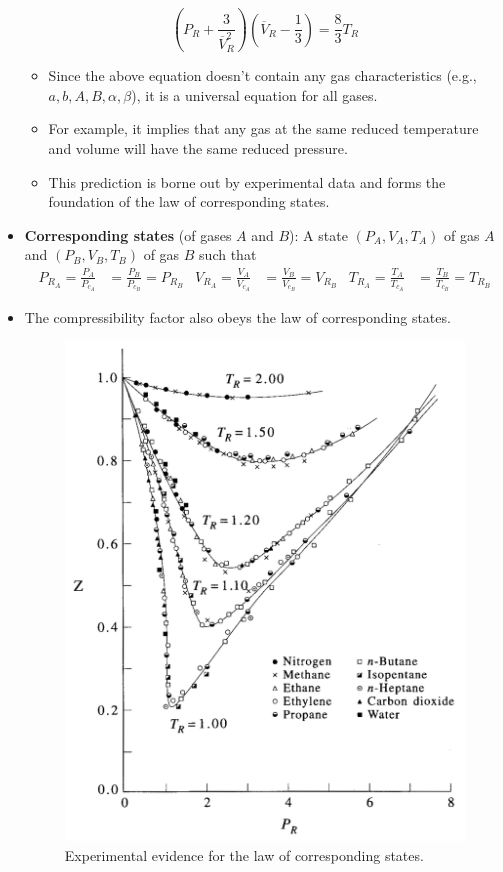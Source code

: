 \documentclass[../notes.tex]{subfiles}
\begin{document}
\begin{itemize}
    \begin{equation*}
        \left( P_R+\frac{3}{\overline{V}_R^2} \right)\left( \overline{V}_R-\frac{1}{3} \right) = \frac{8}{3}T_R
    \end{equation*}
    \begin{itemize}
        \item Since the above equation doesn't contain any gas characteristics (e.g., $a,b,A,B,\alpha,\beta$), it is a universal equation for all gases.
        \item For example, it implies that any gas at the same reduced temperature and volume will have the same reduced pressure.
        \item This prediction is borne out by experimental data and forms the foundation of the law of corresponding states.
    \end{itemize}
    \item \textbf{Corresponding states} (of gases $A$ and $B$): A state $(P_A,V_A,T_A)$ of gas $A$ and $(P_B,V_B,T_B)$ of gas $B$ such that
    \begin{align*}
        P_{R_A} = \frac{P_A}{P_{c_A}} &= \frac{P_B}{P_{c_B}} = P_{R_B}&
        V_{R_A} = \frac{V_A}{V_{c_A}} &= \frac{V_B}{V_{c_B}} = V_{R_B}&
        T_{R_A} = \frac{T_A}{T_{c_A}} &= \frac{T_B}{T_{c_B}} = T_{R_B}
    \end{align*}
    \item The compressibility factor also obeys the law of corresponding states.
    \begin{figure}[h!]
        \centering
        \includegraphics[width=0.5\linewidth]{../ExtFiles/lawCorrespondingStates.png}
        \caption{Experimental evidence for the law of corresponding states.}
        \label{fig:lawCorrespondingStates}
    \end{figure}

\end{itemize}
\end{document}

